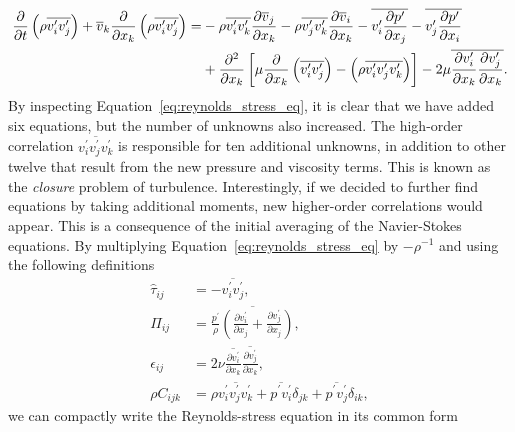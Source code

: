 \begin{equation}
	\begin{aligned}
	\frac{\partial}{\partial t} \left(\rho \overline{v_i^\prime v_j^\prime}\right) 
	+ \overline v_k \frac{\partial}{\partial x_k} \left(\rho \overline{v_i^\prime v_j^\prime}\right) 
	=&
	- \rho \overline{v_i^\prime v_k^\prime}\frac{\partial \overline v_j }{\partial x_k}
	- \rho \overline{v_j^\prime v_k^\prime}\frac{\partial \overline v_{i\vphantom{j}}}{\partial x_k}
	- \overline{v_i^\prime \frac{\partial p^\prime}{\partial x_j}}
	- \overline{v_j^\prime \frac{\partial p^\prime}{\partial x_i}}  \\
	&+ \frac{\partial^2}{\partial x_k}  
	\left[
		\mu \frac{\partial}{\partial x_k} \left(\overline{v_i^\prime v_j^\prime}\right)
		- \left(\rho\overline{v_i^\prime v_j^\prime v_k^\prime }\right) 
	\right]
	- 2 \mu \overline{\frac{\partial v_{i\vphantom{j}}^\prime}{\partial x_k}\frac{\partial v_j^\prime}{\partial x_k}}.
	\end{aligned}
	\label{eq:reynolds_stress_eq}
\end{equation}
By inspecting Equation~\ref{eq:reynolds_stress_eq}, it is clear that we have added six equations, but the number of unknowns also increased. The high-order correlation $\overline{v_i^\prime v_j^\prime v_k^\prime}$ is responsible for ten additional unknowns, in addition to other twelve that result from the new pressure and viscosity terms. This is known as the \textit{closure} problem of turbulence. Interestingly, if we decided to further find equations by taking additional moments, new higher-order correlations would appear. This is a consequence of the initial averaging of the Navier-Stokes equations. By multiplying Equation~\ref{eq:reynolds_stress_eq} by $-\rho^{-1}$ and using the following definitions
\begin{align}
	\hat\tau_{ij} &= -\overline{v_i^\prime v_j^\prime},\\
	\Pi_{ij} &= \overline{\frac{p^\prime}{\rho} \left(\frac{\partial v_i^\prime}{\partial x_j} + \frac{\partial v_j^\prime}{\partial x_j} \right)}, \\
	\epsilon_{ij} &= 2\nu \overline{\frac{\partial v_i^\prime}{\partial x_k}}\overline{\frac{\partial v_j^\prime}{\partial x_k}},\\
	\rho C_{ijk} &= \rho \overline{v_i^\prime v_j^\prime v_k^\prime} + \overline{p^\prime v_i^\prime}\delta_{jk} + \overline{p^\prime v_j^\prime}\delta_{ik},
\end{align}
we can compactly write the Reynolds-stress equation in its common form
